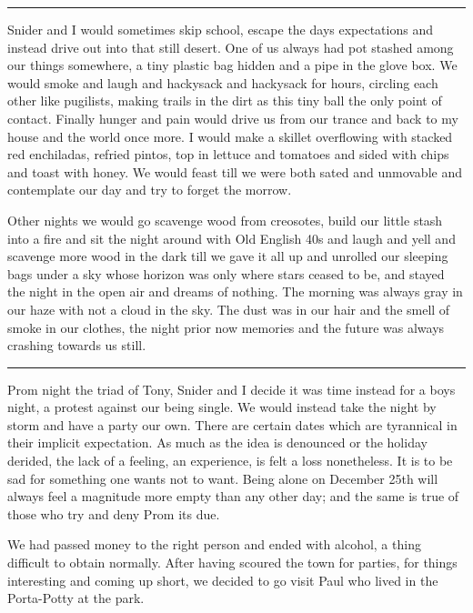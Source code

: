 \documentclass[ebook, 10pt, openright, onecolumn]{memoir}
\newcommand*\td[1]{
  \todo[inline]{
     #1 
  }
}
\newcommand*\starbreak{\fancybreak*{* * *\\}}
\newcommand*\finish{\td{ ----- Finish this section -----}}
\begin{document}
\starbreak

Snider and I would sometimes skip school, escape the days expectations and
instead drive out into that still desert.  One of us always had pot stashed
among our things somewhere, a tiny plastic bag hidden and a pipe in the glove
box. We would smoke and laugh and hackysack and hackysack for hours, circling
each other like pugilists, making trails in the dirt as this tiny ball the only
point of contact.  Finally hunger and pain would drive us from our trance and
back to my house and the world once more.  I would make a skillet overflowing
with stacked red enchiladas, refried pintos, top in lettuce and tomatoes and
sided with chips and toast with honey.  We would feast till we were both sated
and unmovable and contemplate our day and try to forget the morrow.

Other nights we would go scavenge wood from creosotes, build our little
stash into a fire and sit the night around with Old English 40s and laugh and
yell and scavenge more wood in the dark till we gave it all up and unrolled our
sleeping bags under a sky whose horizon was only where stars ceased to be, and
stayed the night in the open air and dreams of nothing.  The morning was always
gray in our haze with not a cloud in the sky.  The dust was in our hair and the
smell of smoke in our clothes, the night prior now memories and the future was
always crashing towards us still.


\finish
\starbreak


Prom night the triad of Tony, Snider and I decide it was time instead for a boys
night, a protest against our being single.  We would instead take the night by
storm and have a party our own.  There are certain dates which are tyrannical in
their implicit expectation.  As much as the idea is denounced or the holiday
derided, the lack of a feeling, an experience, is felt a loss nonetheless.  It
is to be sad for something one wants not to want.  Being alone on December 25th
will always feel a magnitude more empty than any other day; and the same is true
of those who try and deny Prom its due.

We had passed money to the right person and ended with alcohol, a thing
difficult to obtain normally.  After having scoured the town for parties, for
things interesting and coming up short, we decided to go visit Paul who lived in
the Porta-Potty at the park.
\end{document}
